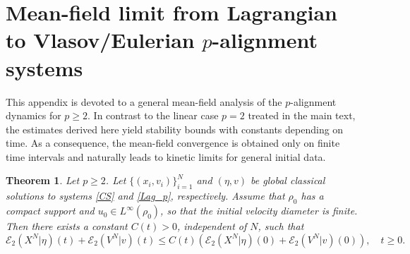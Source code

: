 \documentclass[10pt,reqno]{amsart}
\renewcommand{\geq}{\geqslant}
\renewcommand{\ge}{\geqslant}
\renewcommand{\le}{\leqslant}
\numberwithin{equation}{section}
\newtheorem{theorem}{Theorem}[section]
\newcommand{\lt}{\left}
\newcommand{\rt}{\right}
\begin{document}
 
 \section{Mean-field limit from Lagrangian to Vlasov/Eulerian $p$-alignment systems}\label{app:gene_mf}
 
This appendix is devoted to a general mean-field analysis of the $p$-alignment dynamics for $p\ge2$. In contrast to the linear case $p=2$ treated in the main text, the estimates derived here yield stability bounds with constants depending on time. As a consequence, the mean-field convergence is obtained only on finite time intervals and naturally leads to kinetic limits for general initial data.
 
 \begin{theorem}\label{thm:deri_pLA} Let $p\geq 2$. Let $\{(x_i,v_i)\}_{i=1}^N$ and $(\eta, v)$ be global classical solutions to systems \eqref{CS} and \eqref{Lag_p}, respectively. Assume that $\rho_0$ has a compact support and $u_0 \in L^\infty(\rho_0)$, so that the initial velocity diameter is finite. Then there exists a constant $C(t)>0$, independent of $N$, such that
 \[
\mathscr{E}_2(X^N|\eta)(t)+\mathscr{E}_2(V^N|v)(t)  \le C(t)\lt(\mathscr{E}_2(X^N|\eta)(0)+\mathscr{E}_2(V^N|v)(0)\rt), \quad t \geq 0.
\]
 \end{theorem}
 
\end{document}
